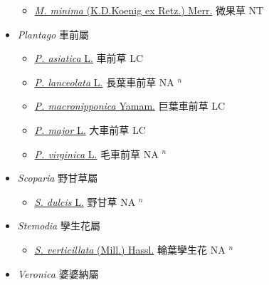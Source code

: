 \begin{itemize}
  \begin{itemize}
        \item[] \href{http://www.theplantlist.org/tpl1.1/search?q=Microcarpaea+minima}{\textit{M. minima} (K.D.Koenig ex Retz.) Merr.}   微果草 NT
  \end{itemize}
 \item[] \textit{Plantago} 車前屬
                    
  \begin{itemize}
        \item[] \href{http://www.theplantlist.org/tpl1.1/search?q=Plantago+asiatica}{\textit{P. asiatica} L.}   車前草 LC
        \item[] \href{http://www.theplantlist.org/tpl1.1/search?q=Plantago+lanceolata}{\textit{P. lanceolata} L.}   長葉車前草 NA $^n$
        \item[] \href{http://www.theplantlist.org/tpl1.1/search?q=Plantago+macronipponica}{\textit{P. macronipponica} Yamam.}   巨葉車前草 LC
        \item[] \href{http://www.theplantlist.org/tpl1.1/search?q=Plantago+major}{\textit{P. major} L.}   大車前草 LC
        \item[] \href{http://www.theplantlist.org/tpl1.1/search?q=Plantago+virginica}{\textit{P. virginica} L.}   毛車前草 NA $^n$
  \end{itemize}
 \item[] \textit{Scoparia} 野甘草屬
                    
  \begin{itemize}
        \item[] \href{http://www.theplantlist.org/tpl1.1/search?q=Scoparia+dulcis}{\textit{S. dulcis} L.}   野甘草 NA $^n$
  \end{itemize}
 \item[] \textit{Stemodia} 孿生花屬
                    
  \begin{itemize}
        \item[] \href{http://www.theplantlist.org/tpl1.1/search?q=Stemodia+verticillata}{\textit{S. verticillata} (Mill.) Hassl.}   輪葉孿生花 NA $^n$
  \end{itemize}
 \item[] \textit{Veronica} 婆婆納屬
                    

\end{itemize}
